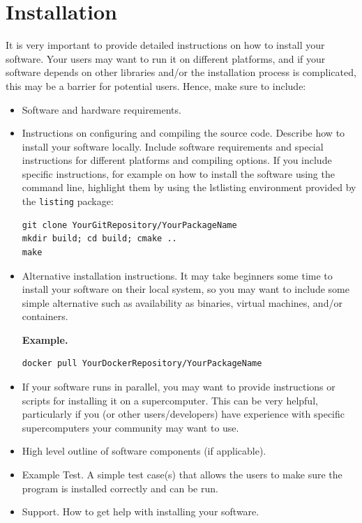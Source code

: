\documentclass{article}
\begin{document}
\section{Installation}

It is very important to provide detailed instructions on how to install your software. Your users may want to run it on different platforms, and if your software depends on other libraries and/or the installation process is complicated, this may be a barrier for potential users. 
Hence, make sure to include:
\begin{itemize}
\item Software and hardware requirements.
\item Instructions on configuring and compiling the source code. Describe how to install your software locally. Include software requirements and special instructions for different platforms and compiling options.
If you include specific instructions, for example on how to install the software using the command line, highlight them by using the lstlisting environment provided by the \texttt{listing} package:
\begin{lstlisting}[frame=single,language=ksh]
git clone YourGitRepository/YourPackageName
mkdir build; cd build; cmake ..
make
\end{lstlisting}

\item Alternative installation instructions. It may take beginners some time to install your software on their local system, so you may want to include some simple alternative such as availability as binaries, virtual machines, and/or containers.

\textbf{Example.}
\begin{lstlisting}[frame=single,language=ksh]
docker pull YourDockerRepository/YourPackageName
\end{lstlisting}

\item If your software runs in parallel, you may want to provide instructions or scripts for installing it on a supercomputer. This can be very helpful, particularly if you (or other users/developers) have experience with specific supercomputers your community may want to use. 
\item High level outline of software components (if applicable).
\item Example Test. A simple test case(s) that allows the users to make sure the program is installed correctly and can be run.
\item Support. How to get help with installing your software.
\end{itemize}
\end{document}
